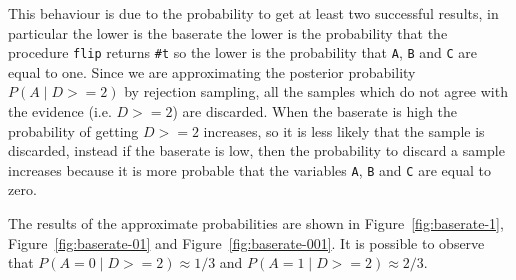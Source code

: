 This behaviour is due to the probability to get at least two successful results, in particular the lower is the baserate the lower
is the probability that the procedure \texttt{flip} returns \texttt{\#t} so the lower is the probability that \texttt{A}, \texttt{B}
and \texttt{C} are equal to one.
Since we are approximating the posterior probability $ P(A\;|\;D >= 2) $ by rejection sampling, all the samples which do not agree with
the evidence (i.e. $D >= 2$) are discarded. When the baserate is high the probability of getting $ D >= 2 $ increases, so it is
less likely that the sample is discarded, instead if the baserate is low, then the probability to discard a sample increases
because it is more probable that the variables \texttt{A}, \texttt{B} and \texttt{C} are equal to zero.

The results of the approximate probabilities are shown in Figure~\ref{fig:baserate-1}, Figure~\ref{fig:baserate-01} and
Figure~\ref{fig:baserate-001}. It is possible to observe that $ P(A = 0\;|\;D >= 2) \approx 1/3 $ and 
$ P(A = 1\;|\;D >= 2) \approx 2/3 $.

